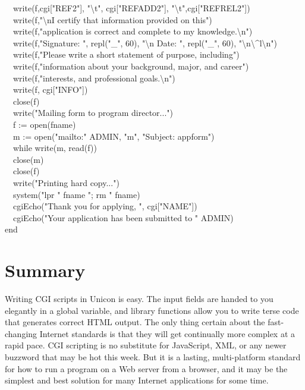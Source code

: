 {\ \ write(f,cgi["REF2"],
"{\textbackslash}t",
cgi["REFADD2"],
"{\textbackslash}t",cgi["REFREL2"]) \\
\ \ write(f,"{\textbackslash}nI certify that information
provided on this") \\
\ \ write(f,"application is correct and complete to my
knowledge.{\textbackslash}n") \\
\ \ write(f,"Signature: ",
repl("\_", 60), "{\textbackslash}n Date: ",
repl("\_", 60), 
"{\textbackslash}n{\textbackslash}\^{}l{\textbackslash}n") \\
\ \ write(f,"Please write a short statement of purpose,
including") \\
\ \ write(f,"information about your background, major, and
career") \\
\ \ write(f,"interests, and professional
goals.{\textbackslash}n") \\
\ \ write(f, cgi["INFO"]) \\
\ \ close(f) \\
\ \ write("Mailing form to program director...") \\
\ \ f := open(fname) \\
\ \ m := open("mailto:" {\textbar}{\textbar} ADMIN, "m", "Subject: appform") \\
\ \ while write(m, read(f)) \\
\ \ close(m) \\
\ \ close(f) \\
\ \ write("Printing hard copy...") \\
\ \ system("lpr " {\textbar}{\textbar} fname {\textbar}{\textbar} "; rm " {\textbar}{\textbar} fname) \\
\ \ cgiEcho("Thank you for applying, ",
cgi["NAME"]) \\
\ \ cgiEcho("Your application has been submitted to
" {\textbar}{\textbar} ADMIN) \\
end
}

\section*{Summary}

Writing CGI scripts in Unicon is easy. The input fields are handed to
you elegantly in a global variable, and library functions allow you to
write terse code that generates correct HTML output. The only thing
certain about the fast-changing Internet standards is that they will
get continually more complex at a rapid pace. CGI scripting is no
substitute for JavaScript, XML, or any
newer buzzword that may be hot this week. But it is a lasting,
multi-platform standard for how to run a program on a Web server from a
browser, and it may be the simplest and best solution for many Internet
applications for some time.
